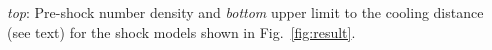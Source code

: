 \label{fig:rhocool}
\emph{top}: Pre-shock number density and \emph{bottom} upper limit to the cooling distance (see text) for the shock models shown in Fig.~\ref{fig:result}.